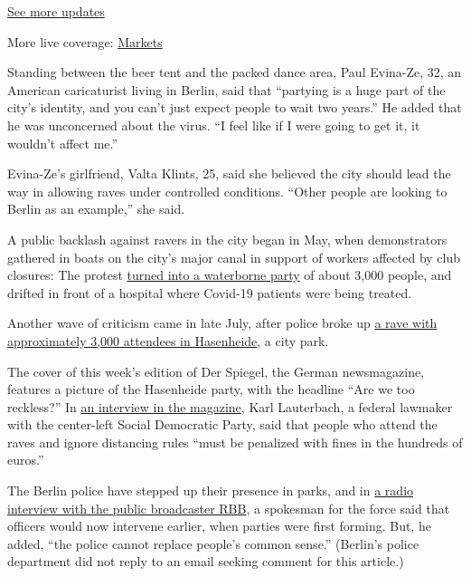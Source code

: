 \href{https://www.nytimes3xbfgragh.onion/2020/08/07/world/covid-19-news.html?action=click\&pgtype=Article\&state=default\&region=MAIN_CONTENT_1\&context=storylines_live_updates}{See
more updates}

More live coverage:
\href{https://www.nytimes3xbfgragh.onion/live/2020/08/07/business/stock-market-today-coronavirus?action=click\&pgtype=Article\&state=default\&region=MAIN_CONTENT_1\&context=storylines_live_updates}{Markets}

Standing between the beer tent and the packed dance area, Paul Evina-Ze,
32, an American caricaturist living in Berlin, said that ``partying is a
huge part of the city's identity, and you can't just expect people to
wait two years.'' He added that he was unconcerned about the virus. ``I
feel like if I were going to get it, it wouldn't affect me.''

Evina-Ze's girlfriend, Valta Klints, 25, said she believed the city
should lead the way in allowing raves under controlled conditions.
``Other people are looking to Berlin as an example,'' she said.

A public backlash against ravers in the city began in May, when
demonstrators gathered in boats on the city's major canal in support of
workers affected by club closures: The protest
\href{https://www.dw.com/en/berlin-police-break-up-floating-party-protest/a-53652185}{turned
into a waterborne party} of about 3,000 people, and drifted in front of
a hospital where Covid-19 patients were being treated.

Another wave of criticism came in late July, after police broke up
\href{https://www.dw.com/en/berlin-parties-during-pandemic/a-54357745}{a
rave with approximately 3,000 attendees in Hasenheide}, a city park.

The cover of this week's edition of Der Spiegel, the German
newsmagazine, features a picture of the Hasenheide party, with the
headline ``Are we too reckless?'' In
\href{https://magazin.spiegel.de/SP/2020/32/172270198/index.html}{an
interview in the magazine}, Karl Lauterbach, a federal lawmaker with the
center-left Social Democratic Party, said that people who attend the
raves and ignore distancing rules ``must be penalized with fines in the
hundreds of euros.''

The Berlin police have stepped up their presence in parks, and in
\href{https://www.rbb24.de/politik/thema/2020/coronavirus/beitraege_neu/2020/07/berlin-demos-querdenken711-illegale-parties-polizei-aufgebot.html}{a
radio interview with the public broadcaster RBB}, a spokesman for the
force said that officers would now intervene earlier, when parties were
first forming. But, he added, ``the police cannot replace people's
common sense.'' (Berlin's police department did not reply to an email
seeking comment for this article.)

